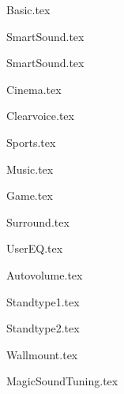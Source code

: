{Basic.tex}

{SmartSound.tex}

{SmartSound.tex}

{Cinema.tex}

{Clearvoice.tex}

{Sports.tex}

{Music.tex}

{Game.tex}

{Surround.tex}


{UserEQ.tex}

{Autovolume.tex}

{Standtype1.tex}	%

 {Standtype2.tex}  %

 {Wallmount.tex}  %

{MagicSoundTuning.tex}